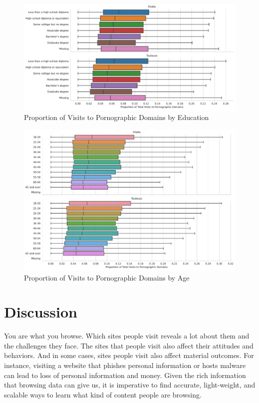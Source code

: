 \documentclass[12pt, letterpaper]{article}
\begin{document}
\begin{figure}[!htb]
  \centering
  \caption{Proportion of Visits to Pornographic Domains by Education}
	\label{fig:prop_visits_porn_educ}
	\includegraphics[width=\textwidth]{../figs/prop_total_visits_porn_edu.pdf}
\end{figure}

\begin{figure}[!htb]
  \centering
  \caption{Proportion of Visits to Pornographic Domains by Age}
	\label{fig:prop_visits_porn_age}
	\includegraphics[width=\textwidth]{../figs/prop_total_visits_porn_age.pdf}
\end{figure}

\section{Discussion}
You are what you browse. Which sites people visit reveals a lot about them and the challenges they face. The sites that people visit also affect their attitudes and behaviors. And in some cases, sites people visit also affect material outcomes. For instance, visiting a website that phishes personal information or hosts malware can lead to loss of personal information and money. Given the rich information that browsing data can give us, it is imperative to find accurate, light-weight, and scalable ways to learn what kind of content people are browsing.
\end{document}
